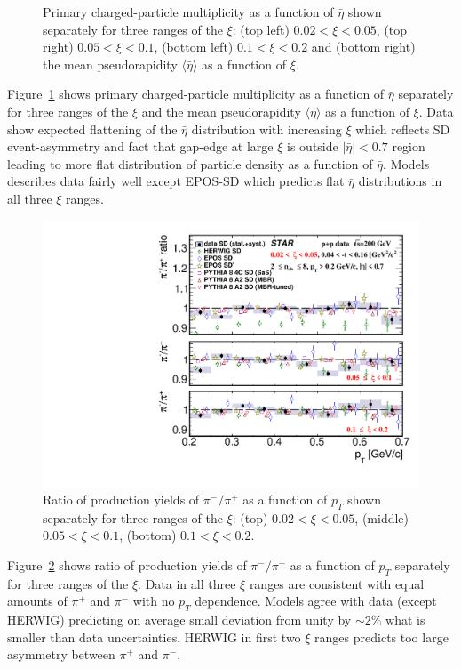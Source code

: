 \begin{figure}[h!]
	\caption[Primary charged-particle multiplicity as a function of $\bar{\eta}$ shown  separately for three ranges of the $\xi$ and the mean pseudorapidity  $\langle\bar{\eta}\rangle$ as a function of $\xi$.]{Primary charged-particle multiplicity as a function of $\bar{\eta}$ shown  separately for three ranges of the $\xi$: (top left) $0.02<\xi<0.05$, (top right) $0.05<\xi<0.1$, (bottom left) $0.1<\xi<0.2$ and (bottom right) the mean pseudorapidity  $\langle\bar{\eta}\rangle$ as a function of $\xi$.}
	\label{fig:results_star_eta}
\end{figure}

Figure~\ref{fig:results_star_eta} shows primary charged-particle multiplicity as a function of $\bar{\eta}$  separately for three ranges of the $\xi$ and the mean pseudorapidity $\langle \bar{\eta} \rangle$ as a function of $\xi$. Data show expected flattening of the $\bar{\eta}$ distribution with increasing $\xi$ which reflects SD event-asymmetry and fact that gap-edge at large $\xi$ is outside $|\bar{\eta}|<0.7$ region leading to more flat distribution of particle density as a function of $\bar{\eta}$. Models describes data fairly well except EPOS-SD which predicts flat $\bar{\eta}$ distributions in all three $\xi$ ranges.

\begin{figure}[h!]
	\centering
	\includegraphics[width=.99\textwidth,page=1]{chapters/chrgSTAR/img/results/particleRatio_prt_0.pdf}
	\caption[Ratio of production yields of $\pi^-/\pi^+$ as a function of $p_T$ shown separately for three ranges of the $\xi$.]{Ratio of production yields of $\pi^-/\pi^+$ as a function of $p_T$ shown separately for three ranges of the $\xi$: (top) $0.02<\xi<0.05$, (middle) $0.05<\xi<0.1$, (bottom) $0.1<\xi<0.2$.}
	\label{fig:results_star_pion}
	
\end{figure}
Figure~\ref{fig:results_star_pion} shows ratio of production yields of $\pi^-/\pi^+$ as a function of $p_T$  separately for three ranges of the $\xi$. Data in all three $\xi$ ranges are consistent with equal amounts of $\pi^+$ and $\pi^-$ with no $p_T$ dependence. Models agree with data (except HERWIG) predicting on average small deviation from unity by $\sim2\%$ what is smaller than data uncertainties. HERWIG in first two $\xi$ ranges predicts too large asymmetry between $\pi^+$ and $\pi^-$.

